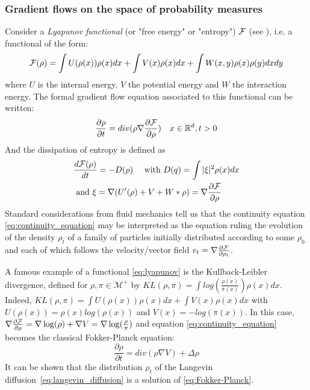\subsubsection{Gradient flows on the space of probability measures}

Consider a \textit{Lyapunov functional} (or "free energy" or "entropy") ${{\mathcal F}}$ (see \citep{Villani:2004}), i.e. a functional of the form:
\begin{equation}\label{eq:lyapunov}
{{\mathcal F}}(\rho)=\int U(\rho(x)) \rho(x)dx + \int V(x)\rho(x)dx + \int W(x,y)\rho(x)\rho(y)dxdy
\end{equation}
where  $U$ is the internal energy, $V$ the potential energy and $W$ the
interaction energy. The formal gradient flow equation associated to this functional can be written:
\begin{equation}\label{eq:continuity_equation}
\frac{\partial \rho}{\partial t}= div( \rho \nabla \frac{\partial {{\mathcal F}}}{\partial \rho}) \quad x \in {{\mathbb R}}^d , t>0
\end{equation}
And the dissipation of entropy is defined as %
\begin{align}
&        \frac{d {{\mathcal F}}(\rho)}{dt} =-D(\rho) \quad \text{ with } D(q)= \int |\xi|^2 \rho(x)dx\\
&\text{ and } \xi= \nabla (U'(\rho) + V + W * \rho)= \nabla \frac{\partial {{\mathcal F}}}{\partial \rho}
\end{align}
Standard considerations from fluid mechanics tell us that the continuity equation \eqref{eq:continuity_equation} may be interpreted as the equation ruling the evolution of the density $\rho_t$ of a family of particles initially distributed according to some $\rho_0$ and each of which follows the velocity/vector field $v_t=\nabla \frac{\partial{{{\mathcal F}}}}{\partial{\rho_t}}$.

\begin{remark} 
	A famous example of a functional \eqref{eq:lyapunov} is the Kullback-Leibler divergence, defined for $\rho, \pi \in \mathcal{M}^+$ by
	$KL(\rho,\pi)=\int log(\frac{\rho(x)}{\pi(x)})\rho(x)dx$. Indeed, $KL(\rho, \pi)=\int U(\rho(x))\rho(x)dx + \int V(x) \rho(x)dx$ with $U(\rho(x))=\rho(x)log(\rho(x))$ and $V(x)=-log(\pi(x))$. In this case, $\nabla \frac{\partial {{\mathcal F}}}{\partial \rho}= \nabla \log(\rho) + \nabla V=  \nabla \log(\frac{\rho}{\pi})$ and equation \eqref{eq:continuity_equation} becomes the classical Fokker-Planck equation:
	\begin{equation}\label{eq:Fokker-Planck}
	\frac{\partial{\rho}}{\partial t}= div(\rho \nabla V )+ \Delta \rho
	\end{equation}
	It can be shown that the distribution $\rho_t$ of the Langevin diffusion~\eqref{eq:langevin_diffusion} is a solution of \eqref{eq:Fokker-Planck}.
\end{remark}

